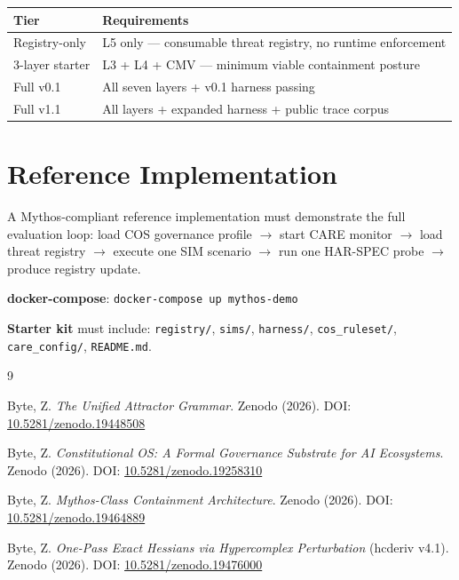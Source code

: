 \documentclass[11pt]{article}
\begin{document}
\begin{table}[h]
\centering
\begin{tabular}{ll}
\toprule
Tier & Requirements \\
\midrule
Registry-only & L5 only --- consumable threat registry, no runtime enforcement \\
3-layer starter & L3 + L4 + CMV --- minimum viable containment posture \\
Full v0.1 & All seven layers + v0.1 harness passing \\
Full v1.1 & All layers + expanded harness + public trace corpus \\
\bottomrule
\end{tabular}
\end{table}


\section{Reference Implementation}

A Mythos-compliant reference implementation must demonstrate the full evaluation loop:
load COS governance profile $\to$ start CARE monitor $\to$ load threat registry $\to$
execute one SIM scenario $\to$ run one HAR-SPEC probe $\to$ produce registry update.

\noindent \textbf{docker-compose}: \texttt{docker-compose up mythos-demo}

\noindent \textbf{Starter kit} must include: \texttt{registry/}, \texttt{sims/},
\texttt{harness/}, \texttt{cos\_ruleset/}, \texttt{care\_config/}, \texttt{README.md}.



\begin{thebibliography}{9}

Byte, Z. \textit{The Unified Attractor Grammar}. Zenodo (2026).
DOI: \href{https://doi.org/10.5281/zenodo.19448508}{10.5281/zenodo.19448508}

Byte, Z. \textit{Constitutional OS: A Formal Governance Substrate for AI Ecosystems}.
Zenodo (2026). DOI: \href{https://doi.org/10.5281/zenodo.19258310}{10.5281/zenodo.19258310}

Byte, Z. \textit{Mythos-Class Containment Architecture}. Zenodo (2026).
DOI: \href{https://doi.org/10.5281/zenodo.19464889}{10.5281/zenodo.19464889}

Byte, Z. \textit{One-Pass Exact Hessians via Hypercomplex Perturbation} (hcderiv v4.1).
Zenodo (2026). DOI: \href{https://doi.org/10.5281/zenodo.19476000}{10.5281/zenodo.19476000}

\end{thebibliography}
\end{document}
